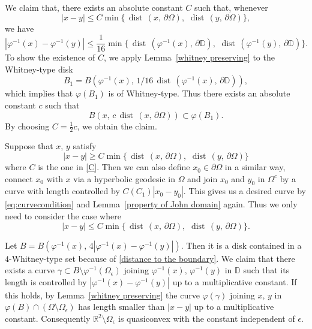 \documentclass[reqno,11pt]{amsart}
\def\dist{{\mathop\mathrm{\,dist\,}}}
\def\ez{\epsilon}
\numberwithin{equation}{section}
\theoremstyle{remark}
\begin{document}
We claim that, there exists an absolute constant $C$ such that, whenever 
\begin{equation}\label{C}
|x-y|\le C \min\{\dist(x,\,\partial \Omega),\,\dist(y,\,\partial \Omega)\},
\end{equation}
we have 
\begin{equation}\label{distance to the boundary}
|\varphi^{-1}(x)-\varphi^{-1}(y)|\le \frac 1 {16} \min\{\dist(\varphi^{-1}(x),\,\partial \mathbb D),\,\dist(\varphi^{-1}(y),\,\partial \mathbb D)\}. 
\end{equation}
To show the existence of $C$, we apply Lemma~\ref{whitney preserving} to the Whitney-type disk 
\[
B_1=B(\varphi^{-1}(x),\, 1 / {16} \dist(\varphi^{-1}(x),\,\partial \mathbb D)),
\]
which implies that
$\varphi(B_1)$ is of Whitney-type. Thus there exists an absolute constant $c$ such that 
$$B(x,\,c\dist(x,\,\partial \Omega))\subset \varphi(B_1).$$
By  choosing $C=\frac 1 2 c$, we obtain the claim. 

Suppose that $x,\,y$ satisfy 
$$|x-y|\ge C \min\{\dist(x,\,\partial \Omega),\,\dist(y,\,\partial \Omega)\}$$ 
where $C$  is the one in \eqref{C}. Then we can also define $x_0\in \partial \Omega$ in a similar way, connect $x_0$ with $x$ via a hyperbolic geodesic in $\Omega$ and join $x_0$ and $y_0$ in $\Omega^c$ by a curve with length controlled by $C(C_1)|x_0-y_0|$. This gives us a desired curve by \eqref{eq:curvecondition} and Lemma~\ref{property of John domain} again. Thus we only need to consider the case where 
$$|x-y|\le C \min\{\dist(x,\,\partial \Omega),\,\dist(y,\,\partial \Omega)\}. $$

Let $B=B(\varphi^{-1}(x),\, 4 |\varphi^{-1}(x)-\varphi^{-1}(y)|)$. Then it is a disk contained in a 
$4$-Whitney-type set because of \eqref{distance to the boundary}. 
We claim that  there exists a curve $\gamma\subset B\setminus\varphi^{-1}(\Omega_\ez)$ joining $\varphi^{-1}(x),\,\varphi^{-1}(y)$ in $\mathbb D$ such that its length is controlled by $|\varphi^{-1}(x)-\varphi^{-1}(y)|$ up to a multiplicative constant. If this holds,  by Lemma~\ref{whitney preserving} the curve $\varphi(\gamma)$ joining $x,\,y$ in $\varphi(B)\cap (\Omega\setminus\Omega_\ez)$ has length smaller than $|x-y|$ up to a multiplicative constant. Consequently $\mathbb R^2\setminus\Omega_\ez$ is quasiconvex with the constant independent of $\ez$. 
\end{document}
